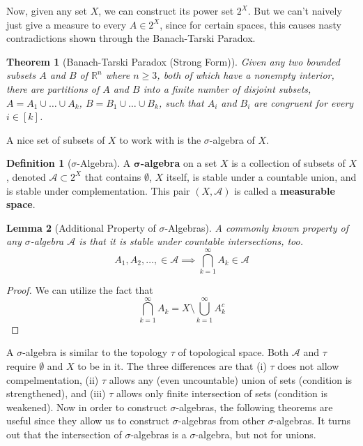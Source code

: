 \documentclass{article}
\newtheorem{theorem}{Theorem}[section]
\newtheorem{lemma}[theorem]{Lemma}
\theoremstyle{remark}
\theoremstyle{definition}
\newtheorem{definition}{Definition}[section]
\begin{document}
Now, given any set $X$, we can construct its power set $2^X$. But we can't naively just give a measure to every $A \in 2^X$, since for certain spaces, this causes nasty contradictions shown through the Banach-Tarski Paradox. 

\begin{theorem}[Banach-Tarski Paradox (Strong Form)]
Given any two bounded subsets $A$ and $B$ of $\mathbb{R}^n$ where $n \geq 3$, both of which have a nonempty interior, there are partitions of $A$ and $B$ into a finite number of disjoint subsets, $A = A_1 \cup \ldots \cup A_k$, $B = B_1 \cup \ldots \cup B_k$, such that $A_i$ and $B_i$ are congruent for every $i \in [k]$. 
\end{theorem}

A nice set of subsets of $X$ to work with is the $\sigma$-algebra of $X$. 

\begin{definition}[$\sigma$-Algebra]
A \textbf{$\boldsymbol{\sigma}$-algebra} on a set $X$ is a collection  of subsets of $X$, denoted $\mathcal{A} \subset 2^X$ that contains $\emptyset$, $X$ itself, is stable under a countable union, and is stable under complementation. This pair $(X, \mathcal{A})$ is called a \textbf{measurable space}. 
\end{definition}

\begin{lemma}[Additional Property of $\sigma$-Algebras]
A commonly known property of any $\sigma$-algebra $\mathcal{A}$ is that it is stable under countable intersections, too. 
\[A_1, A_2, \ldots, \in \mathcal{A} \implies \bigcap_{k=1}^\infty A_k \in \mathcal{A}\]
\end{lemma}
\begin{proof}
We can utilize the fact that 
\[\bigcap_{k=1}^\infty A_k = X \setminus \bigcup_{k=1}^\infty A_k^c\]
\end{proof}

A $\sigma$-algebra is similar to the topology $\tau$ of topological space. Both $\mathcal{A}$ and $\tau$ require $\emptyset$ and $X$ to be in it. The three differences are that (i) $\tau$ does not allow compelmentation, (ii) $\tau$ allows any (even uncountable) union of sets (condition is strengthened), and (iii) $\tau$ allows only finite intersection of sets (condition is weakened). Now in order to construct $\sigma$-algebras, the following theorems are useful since they allow us to construct $\sigma$-algebras from other $\sigma$-algebras. It turns out that the intersection of $\sigma$-algebras is a $\sigma$-algebra, but not for unions. 
\end{document}

